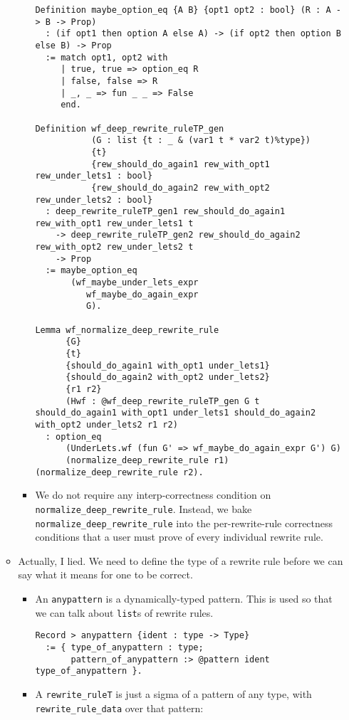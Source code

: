 \begin{itemize}
\begin{itemize}
\begin{itemize}
\begin{verbatim}
Definition maybe_option_eq {A B} {opt1 opt2 : bool} (R : A -> B -> Prop)
  : (if opt1 then option A else A) -> (if opt2 then option B else B) -> Prop
  := match opt1, opt2 with
     | true, true => option_eq R
     | false, false => R
     | _, _ => fun _ _ => False
     end.

Definition wf_deep_rewrite_ruleTP_gen
           (G : list {t : _ & (var1 t * var2 t)%type})
           {t}
           {rew_should_do_again1 rew_with_opt1 rew_under_lets1 : bool}
           {rew_should_do_again2 rew_with_opt2 rew_under_lets2 : bool}
  : deep_rewrite_ruleTP_gen1 rew_should_do_again1 rew_with_opt1 rew_under_lets1 t
    -> deep_rewrite_ruleTP_gen2 rew_should_do_again2 rew_with_opt2 rew_under_lets2 t
    -> Prop
  := maybe_option_eq
       (wf_maybe_under_lets_expr
          wf_maybe_do_again_expr
          G).

Lemma wf_normalize_deep_rewrite_rule
      {G}
      {t}
      {should_do_again1 with_opt1 under_lets1}
      {should_do_again2 with_opt2 under_lets2}
      {r1 r2}
      (Hwf : @wf_deep_rewrite_ruleTP_gen G t should_do_again1 with_opt1 under_lets1 should_do_again2 with_opt2 under_lets2 r1 r2)
  : option_eq
      (UnderLets.wf (fun G' => wf_maybe_do_again_expr G') G)
      (normalize_deep_rewrite_rule r1) (normalize_deep_rewrite_rule r2).
\end{verbatim}
    \item
      We do not require any interp-correctness condition on
      \texttt{normalize\_deep\_rewrite\_rule}. Instead, we bake
      \texttt{normalize\_deep\_rewrite\_rule} into the per-rewrite-rule
      correctness conditions that a user must prove of every individual
      rewrite rule.
    \end{itemize}
  \item
    Actually, I lied. We need to define the type of a rewrite rule
    before we can say what it means for one to be correct.

    \begin{itemize}
    \item
      An \texttt{anypattern} is a dynamically-typed pattern. This is
      used so that we can talk about \texttt{list}s of rewrite rules.

\begin{verbatim}
Record > anypattern {ident : type -> Type}
  := { type_of_anypattern : type;
       pattern_of_anypattern :> @pattern ident type_of_anypattern }.
\end{verbatim}
    \item
      A \texttt{rewrite\_ruleT} is just a sigma of a pattern of any
      type, with \texttt{rewrite\_rule\_data} over that pattern:


\end{itemize}
\end{itemize}
\end{itemize}
